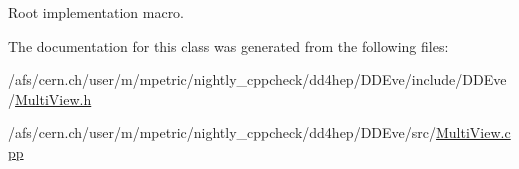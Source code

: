 Root implementation macro. 



The documentation for this class was generated from the following files\+:\begin{DoxyCompactItemize}
\item 
/afs/cern.\+ch/user/m/mpetric/nightly\+\_\+cppcheck/dd4hep/\+D\+D\+Eve/include/\+D\+D\+Eve/\hyperlink{_multi_view_8h}{Multi\+View.\+h}\item 
/afs/cern.\+ch/user/m/mpetric/nightly\+\_\+cppcheck/dd4hep/\+D\+D\+Eve/src/\hyperlink{_multi_view_8cpp}{Multi\+View.\+cpp}\end{DoxyCompactItemize}
